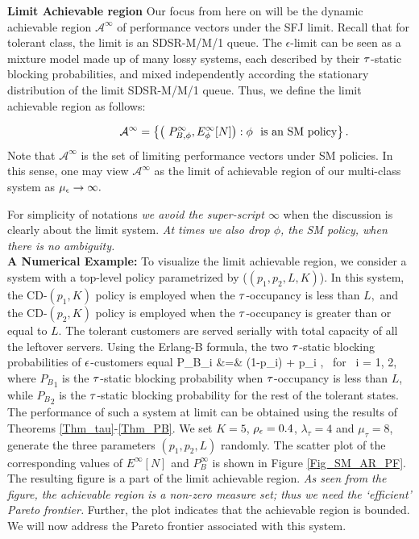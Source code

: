  
{\bf Limit Achievable region} Our focus from here on will be the
dynamic achievable region $\mathcal{A}^{\infty}$ of performance
vectors under the SFJ limit. Recall that for tolerant class, the limit
is an SDSR-M/M/1 queue. The $\epsilon$-limit can be seen as a mixture
model made up of many lossy systems, each described by their
${\tau}$-static blocking probabilities, and mixed independently according
the stationary distribution of the limit SDSR-M/M/1 queue.  Thus, we
define the limit achievable region as follows:
 
 
{\small \begin{align*} \hspace{15mm}
\mathcal{A}^{\infty} =\left  \{  \left  ( \ P_{B, \phi}^\infty, E_\phi^{\infty}[N ]  \right  )  : \phi \ \ \mbox{is an SM  policy} \right  \}.
\end{align*}}
Note that $\mathcal{A}^{\infty}$ is the set of limiting performance
vectors under SM policies. In this sense, one may view
$\mathcal{A}^{\infty}$ as the limit of achievable region of our
multi-class system as ${\mu_\epsilon} \rightarrow \infty.$

For simplicity of notations {\it we avoid the super-script $\infty$}
when the discussion is clearly about the limit system.  {\it At times
  we also drop $\phi$, the SM policy, when there is no ambiguity.}
\\ 

  {\bf A Numerical Example:} To visualize the limit achievable region,
  we consider a system with a top-level policy parametrized by
  ($(p_1, p_2, L, K)$). In this system, the CD-$(p_1,K)$ policy is
  employed when the ${\tau}$-occupancy is less than $L,$ and the
  CD-$(p_2,K)$ policy is employed when the ${\tau}$-occupancy is greater
  than or equal to $L.$
    The tolerant customers are served serially with total capacity of
  all the leftover servers.
 Using the Erlang-B formula, the two ${\tau}$-static blocking probabilities
  of ${ \epsilon }$-customers equal   
  \beq \hspace{15mm} {P_B}_i &=& (1-p_i) + p_i
     , \mbox{ for } i = 1, 2,  
 \eeq  where ${P_B}_1$ is the ${\tau}$-static blocking probability when ${\tau}$-occupancy is less than $L$, while  ${P_B}_2$ is the ${\tau}$-static blocking probability  for the rest of the tolerant states. The performance of such a system at
  limit can be obtained using the results of Theorems
  \ref{Thm_tau}-\ref{Thm_PB}.  We set $ K = 5$, $\rho_{ \epsilon } = 0.4$,
  $\lambda_\tau = 4 $ and $\mu_\tau = 8$, generate the three
  parameters $(p_1, p_2, L)$ randomly. The scatter plot of the
  corresponding values of $E^\infty [N]$ and $P^\infty_B$ is shown in
  Figure \ref{Fig_SM_AR_PF}. The resulting figure is a part of the
  limit achievable region. {\it As seen from the figure, the achievable
  region is a non-zero measure set; thus we need the `efficient' Pareto frontier.} Further, the plot indicates that
  the achievable region is bounded. We will now address the Pareto
  frontier associated with this system. %
  

